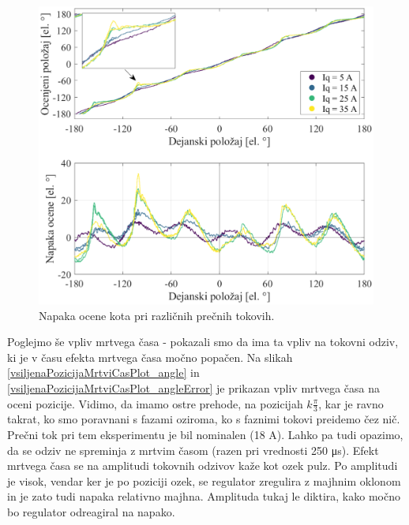 \documentclass[a4paper,twoside,openright,12pt,slovene]{book}
\begin{document}
\begin{figure}[!htbp]
    \centering
    \includegraphics[width=1.0\columnwidth]{Slike/vsiljenaPozicijaTokovi_angleError.eps}
    \caption{\label{vsiljenaPozicijaTokovi_angleError} Napaka ocene kota pri različnih prečnih tokovih. }
\end{figure}

Poglejmo še vpliv mrtvega časa - pokazali smo da ima ta vpliv na tokovni odziv, ki je v času efekta mrtvega časa močno popačen. Na slikah \ref{vsiljenaPozicijaMrtviCasPlot_angle} in
\ref{vsiljenaPozicijaMrtviCasPlot_angleError} je prikazan vpliv mrtvega časa na oceni pozicije. Vidimo, da imamo ostre prehode, na pozicijah $k\frac{\pi}{3}$, kar je ravno takrat, ko smo poravnani s
fazami oziroma, ko s faznimi tokovi preidemo čez nič. Prečni tok pri tem eksperimentu je bil nominalen (18 A). Lahko pa tudi opazimo, da se odziv ne spreminja z mrtvim časom (razen pri vrednosti
250 μs). Efekt mrtvega časa se na amplitudi tokovnih odzivov kaže kot ozek pulz. Po amplitudi je visok, vendar ker je po poziciji ozek, se regulator zregulira z majhnim oklonom in je zato tudi napaka
relativno majhna. Amplituda tukaj le diktira, kako močno bo regulator odreagiral na napako.
\end{document}
